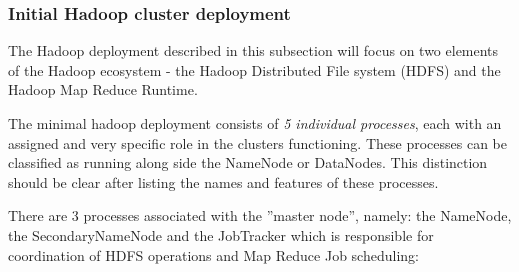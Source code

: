 \subsubsection{Initial Hadoop cluster deployment}

The Hadoop deployment described in this subsection will focus on two elements of the Hadoop ecosystem - the Hadoop Distributed File system (HDFS) and the Hadoop Map Reduce Runtime.

The minimal hadoop deployment consists of \textit{5 individual processes}, each with an assigned and very specific role in the clusters functioning. These processes can be classified as running along side the NameNode or DataNodes. This distinction should be clear after listing the names and features of these processes.

There are 3 processes associated with the ''master node'', namely: the NameNode, the SecondaryNameNode and the JobTracker which is responsible for coordination of HDFS operations and Map Reduce Job scheduling:

